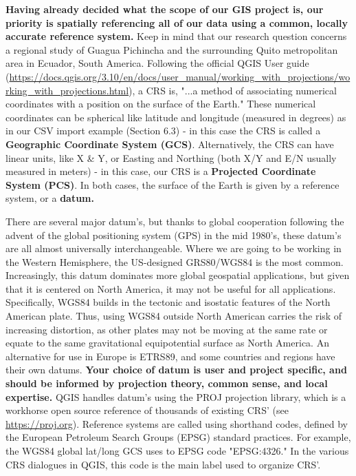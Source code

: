 \documentclass{article}
\begin{document}
\textbf{Having already decided what the scope of our GIS project is, our priority is spatially referencing all of our data using a common, locally accurate reference system.} Keep in mind that our research question concerns a regional study of Guagua Pichincha and the surrounding Quito metropolitan area in Ecuador, South America. Following the official QGIS User guide (\url{https://docs.qgis.org/3.10/en/docs/user_manual/working_with_projections/working_with_projections.html}), a CRS is, "...a method of associating numerical coordinates with a position on the surface of the Earth." These numerical coordinates can be spherical like latitude and longitude (measured in degrees) as in our CSV import example (Section 6.3) - in this case the CRS is called a \textbf{Geographic Coordinate System (GCS)}. Alternatively, the CRS can have linear units, like X \& Y, or Easting and Northing (both X/Y and E/N usually measured in meters) - in this case, our CRS is a \textbf{Projected Coordinate System (PCS)}. In both cases, the surface of the Earth is given by a reference system, or a \textbf{datum.} 

There are several major datum's, but thanks to global cooperation following the advent of the global positioning system (GPS) in the mid 1980's, these datum's are all almost universally interchangeable. Where we are going to be working in the Western Hemisphere, the US-designed GRS80/WGS84 is the most common. Increasingly, this datum dominates more global geospatial applications, but given that it is centered on North America, it may not be useful for all applications. Specifically, WGS84 builds in the tectonic and isostatic features of the North American plate. Thus, using WGS84 outside North American carries the risk of increasing distortion, as other plates may not be moving at the same rate or equate to the same gravitational equipotential surface as North America. An alternative for use in Europe is ETRS89, and some countries and regions have their own datums. \textbf{Your choice of datum is user and project specific, and should be informed by projection theory, common sense, and local expertise.} QGIS handles datum's using the PROJ projection library, which is a workhorse open source reference of thousands of existing CRS' (see \url{https://proj.org}). Reference systems are called using shorthand codes, defined by the European Petroleum Search Groups (EPSG) standard practices. For example, the WGS84 global lat/long GCS uses to EPSG code "EPSG:4326." In the various CRS dialogues in QGIS, this code is the main label used to organize CRS'. 
\end{document}
